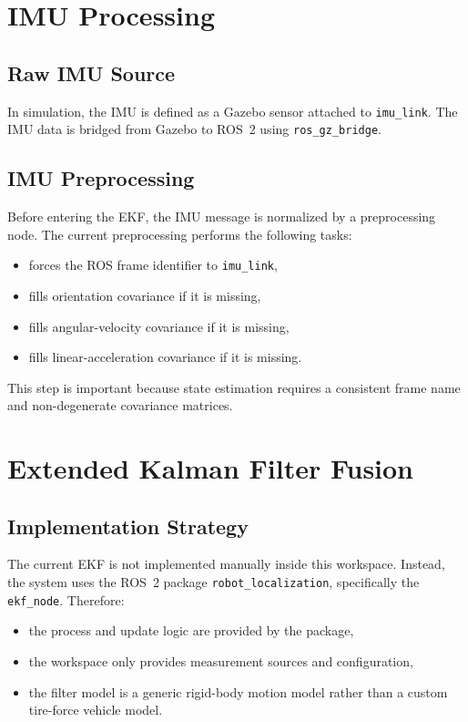 \documentclass[12pt,a4paper]{report}
\begin{document}
\chapter{IMU Processing}

\section{Raw IMU Source}
In simulation, the IMU is defined as a Gazebo sensor attached to \texttt{imu\_link}. The IMU data is bridged from Gazebo to ROS~2 using \texttt{ros\_gz\_bridge}.

\section{IMU Preprocessing}
Before entering the EKF, the IMU message is normalized by a preprocessing node. The current preprocessing performs the following tasks:
\begin{itemize}[leftmargin=*]
  \item forces the ROS frame identifier to \texttt{imu\_link},
  \item fills orientation covariance if it is missing,
  \item fills angular-velocity covariance if it is missing,
  \item fills linear-acceleration covariance if it is missing.
\end{itemize}

This step is important because state estimation requires a consistent frame name and non-degenerate covariance matrices.

\chapter{Extended Kalman Filter Fusion}

\section{Implementation Strategy}
The current EKF is not implemented manually inside this workspace. Instead, the system uses the ROS~2 package \texttt{robot\_localization}, specifically the \texttt{ekf\_node}. Therefore:
\begin{itemize}[leftmargin=*]
  \item the process and update logic are provided by the package,
  \item the workspace only provides measurement sources and configuration,
  \item the filter model is a generic rigid-body motion model rather than a custom tire-force vehicle model.
\end{itemize}
\end{document}
